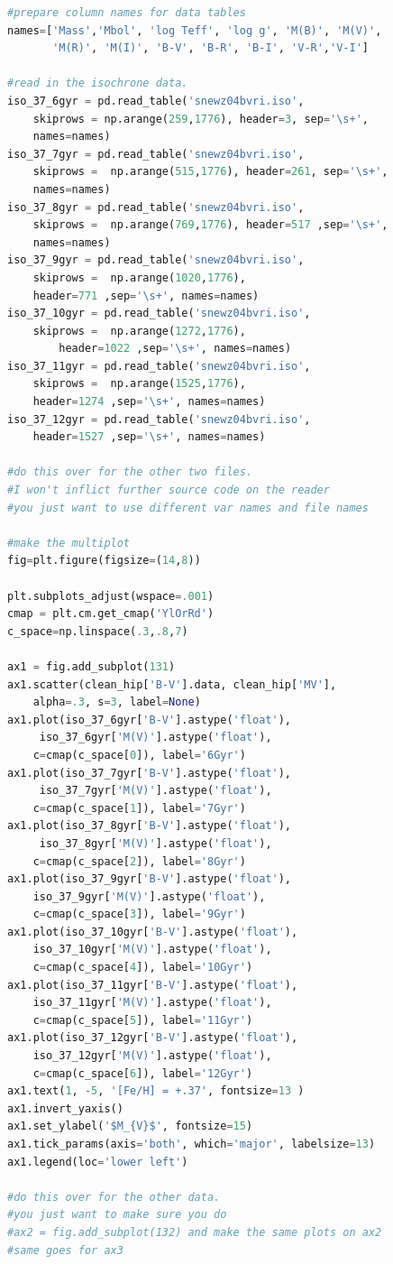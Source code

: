 \documentclass[12pt]{article}
\begin{document}
\begin{lstlisting}[language=Python]
#prepare column names for data tables
names=['Mass','Mbol', 'log Teff', 'log g', 'M(B)', 'M(V)',
       'M(R)', 'M(I)', 'B-V', 'B-R', 'B-I', 'V-R','V-I']
       
#read in the isochrone data. 
iso_37_6gyr = pd.read_table('snewz04bvri.iso',
	skiprows = np.arange(259,1776), header=3, sep='\s+',
	names=names)
iso_37_7gyr = pd.read_table('snewz04bvri.iso',
	skiprows =  np.arange(515,1776), header=261, sep='\s+',
	names=names)
iso_37_8gyr = pd.read_table('snewz04bvri.iso',
	skiprows =  np.arange(769,1776), header=517 ,sep='\s+',
	names=names)
iso_37_9gyr = pd.read_table('snewz04bvri.iso',
	skiprows =  np.arange(1020,1776),
	header=771 ,sep='\s+', names=names)
iso_37_10gyr = pd.read_table('snewz04bvri.iso', 
	skiprows =  np.arange(1272,1776),
        header=1022 ,sep='\s+', names=names)
iso_37_11gyr = pd.read_table('snewz04bvri.iso',
	skiprows =  np.arange(1525,1776),
	header=1274 ,sep='\s+', names=names)
iso_37_12gyr = pd.read_table('snewz04bvri.iso',
	header=1527 ,sep='\s+', names=names)

#do this over for the other two files. 
#I won't inflict further source code on the reader
#you just want to use different var names and file names

#make the multiplot
fig=plt.figure(figsize=(14,8))

plt.subplots_adjust(wspace=.001)
cmap = plt.cm.get_cmap('YlOrRd')
c_space=np.linspace(.3,.8,7)

ax1 = fig.add_subplot(131)
ax1.scatter(clean_hip['B-V'].data, clean_hip['MV'],
	alpha=.3, s=3, label=None)
ax1.plot(iso_37_6gyr['B-V'].astype('float'),
	 iso_37_6gyr['M(V)'].astype('float'),
	c=cmap(c_space[0]), label='6Gyr')
ax1.plot(iso_37_7gyr['B-V'].astype('float'),
	 iso_37_7gyr['M(V)'].astype('float'),
	c=cmap(c_space[1]), label='7Gyr')
ax1.plot(iso_37_8gyr['B-V'].astype('float'),
	 iso_37_8gyr['M(V)'].astype('float'),
	c=cmap(c_space[2]), label='8Gyr')
ax1.plot(iso_37_9gyr['B-V'].astype('float'), 
	iso_37_9gyr['M(V)'].astype('float'), 
	c=cmap(c_space[3]), label='9Gyr')
ax1.plot(iso_37_10gyr['B-V'].astype('float'), 
	iso_37_10gyr['M(V)'].astype('float'),
	c=cmap(c_space[4]), label='10Gyr')
ax1.plot(iso_37_11gyr['B-V'].astype('float'), 
	iso_37_11gyr['M(V)'].astype('float'), 
	c=cmap(c_space[5]), label='11Gyr')
ax1.plot(iso_37_12gyr['B-V'].astype('float'), 
	iso_37_12gyr['M(V)'].astype('float'), 
	c=cmap(c_space[6]), label='12Gyr')
ax1.text(1, -5, '[Fe/H] = +.37', fontsize=13 )
ax1.invert_yaxis()
ax1.set_ylabel('$M_{V}$', fontsize=15)
ax1.tick_params(axis='both', which='major', labelsize=13)
ax1.legend(loc='lower left')

#do this over for the other data.
#you just want to make sure you do
#ax2 = fig.add_subplot(132) and make the same plots on ax2
#same goes for ax3
\end{lstlisting}
\end{document}
